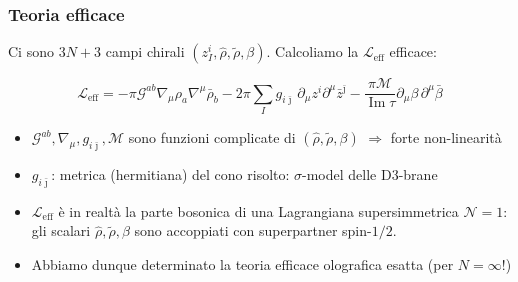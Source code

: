\documentclass[aspectratio=43,mathserif]{beamer}
\newcommand{\ess}{\mathbb{S}}
\newcommand{\ssn}{\mathcal{N}}
\newcommand{\hatt}[1]{\ensuremath{\widehat{#1}}}
\newcommand{\tildd}[1]{\ensuremath{\widetilde{#1}}}
\renewcommand{\Im}{\ensuremath{\operatorname{Im}}}
\newcommand{\leff}{\ensuremath{\mathcal{L}_\text{eff}}}
\begin{document}
%
%


\begin{frame}
	\frametitle{Teoria efficace}
	Ci sono $3N+3$ campi chirali $(z_I^i, \hatt\rho, \tildd\rho, \beta)$. Calcoliamo la $\leff$ efficace:

	\begin{equation}
		\leff = - \pi \mathcal{G}^{ab} \nabla_\mu \rho_a \nabla^\mu \bar\rho_b - 2\pi \sum_I g_{i\bar\jmath}\, \partial_\mu z^i \partial^\mu \bar z^{\bar\jmath} - \frac{\pi\mathcal{M}}{\Im \tau} \partial_\mu \beta \,\partial^\mu \bar\beta
		\label{}
	\end{equation}

	\begin{itemize}
		\item $\mathcal{G}^{ab},\nabla_\mu,g_{i\bar\jmath},\mathcal{M}$ sono funzioni complicate di $(\hatt\rho,\tildd\rho,\beta)$ $\Longrightarrow$ forte non-linearità
		\item $g_{i\bar\jmath}$: metrica (hermitiana) del cono risolto: $\sigma$-model delle D3-brane
		\item $\leff$ è in realtà la parte bosonica di una Lagrangiana supersimmetrica $\ssn=1$: gli scalari $\hatt\rho,\tildd\rho,\beta$ sono accoppiati con superpartner spin-$1/2$.
		\item Abbiamo dunque determinato la teoria efficace olografica esatta (per $N = \infty$!)
	\end{itemize}



\end{frame}
\end{document}
